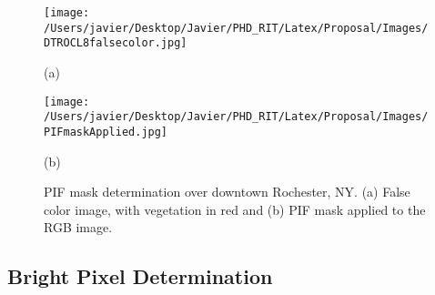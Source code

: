 \documentclass[]{spie}  %
\begin{document}
\begin{figure}[htb]
  \begin{minipage}[c]{0.48\linewidth}
    \centering
      \texttt{[image: /Users/javier/Desktop/Javier/PHD\_RIT/Latex/Proposal/Images/DTROCL8falsecolor.jpg]}  
    \centerline{(a)}\medskip
  \end{minipage}
  \hfill
  \begin{minipage}[d]{0.48\linewidth}
    \centering
      \texttt{[image: /Users/javier/Desktop/Javier/PHD\_RIT/Latex/Proposal/Images/PIFmaskApplied.jpg]}
    \centerline{(b)}\medskip
  \end{minipage}
  \caption{PIF mask determination over downtown Rochester, NY. (a) False color image, with vegetation in red and (b) PIF mask applied to the RGB image. \label{fig:PIFmask} } 
\end{figure}

\subsection{Bright Pixel Determination}
\end{document}
